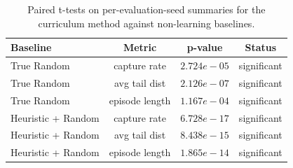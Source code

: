 \begin{table}[t]
\centering
\caption{Quantitative comparison across the proposed curriculum method and non-learning baselines. Metrics are reported as mean $\pm$ std over evaluation-seed summaries.}
\label{tab:baseline_comparison}
\end{table}

\begin{table}[t]
\centering
\caption{Paired t-tests on per-evaluation-seed summaries for the curriculum method against non-learning baselines.}
\label{tab:significance}
\begin{tabular}{lccc}
\toprule
\textbf{Baseline} & \textbf{Metric} & \textbf{p-value} & \textbf{Status} \\
\midrule
True Random & capture rate & $2.724e-05$ & significant \\
True Random & avg tail dist & $2.126e-07$ & significant \\
True Random & episode length & $1.167e-04$ & significant \\
Heuristic + Random & capture rate & $6.728e-17$ & significant \\
Heuristic + Random & avg tail dist & $8.438e-15$ & significant \\
Heuristic + Random & episode length & $1.865e-14$ & significant \\
\bottomrule
\end{tabular}
\end{table}